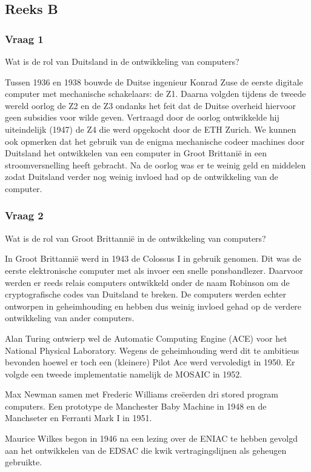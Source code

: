 \documentclass[../main.tex]{subfiles}
\begin{document}
\subsection{Reeks B}
\subsubsection{Vraag 1}
\begin{question}
Wat is de rol van Duitsland in de ontwikkeling van computers?
\end{question}

\begin{solution}
Tussen 1936 en 1938 bouwde de Duitse ingenieur Konrad Zuse de eerste digitale computer met mechanische schakelaars: de Z1.
Daarna volgden tijdens de tweede wereld oorlog de Z2 en de Z3 ondanks het feit dat de Duitse overheid hiervoor geen subsidies voor wilde geven.
Vertraagd door de oorlog ontwikkelde hij uiteindelijk (1947) de Z4 die werd opgekocht door de ETH Zurich.
We kunnen ook opmerken dat het gebruik van de enigma mechanische codeer machines door Duitsland het ontwikkelen van een computer in Groot Brittani\"e in een stroomversnelling heeft gebracht.
Na de oorlog was er te weinig geld en middelen zodat Duitsland verder nog weinig invloed had op de ontwikkeling van de computer.
\end{solution}

\subsubsection{Vraag 2}
\begin{question}
Wat is de rol van Groot Brittanni\"e in de ontwikkeling van computers?
\end{question}
\begin{solution}
In Groot Brittanni\"e werd in 1943 de Colossus I in gebruik genomen. Dit was de eerste elektronische computer met als invoer een snelle ponsbandlezer. 
Daarvoor werden er reeds relais computers ontwikkeld onder de naam Robinson om de cryptografische codes van Duitsland te breken.
De computers werden echter ontworpen in geheimhouding en hebben dus weinig invloed gehad op de verdere ontwikkeling van ander computers.

Alan Turing ontwierp wel de Automatic Computing Engine (ACE) voor het National Physical Laboratory. 
Wegens de geheimhouding werd dit te ambitieus bevonden hoewel er toch een (kleinere) Pilot Ace werd vervoledigt in 1950.
Er volgde een tweede implementatie namelijk de MOSAIC in 1952.

Max Newman samen met Frederic Williams cre\"eerden dri stored program computers.
Een prototype de Manchester Baby Machine in 1948 en de Manchseter en Ferranti Mark I in 1951.

Maurice Wilkes  begon in 1946 na een lezing over de ENIAC te hebben gevolgd aan het ontwikkelen van de EDSAC die kwik vertragingslijnen als geheugen gebruikte.
\end{solution}
\end{document}
